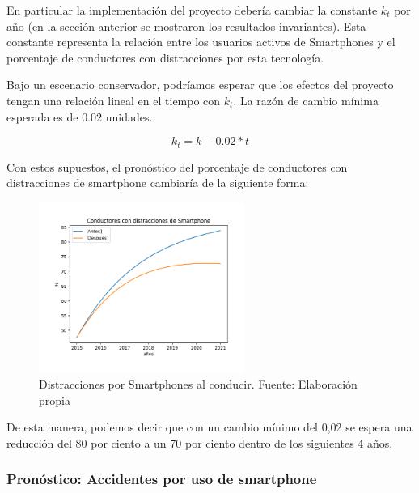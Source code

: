 \documentclass{article}
\begin{document}
En particular la implementación del proyecto debería cambiar la constante $k_t$ por año (en la sección anterior
se mostraron los resultados invariantes). Esta constante representa la relación entre los usuarios activos de Smartphones
y el porcentaje de conductores con distracciones por esta tecnología.

Bajo un escenario conservador, podríamos esperar que los efectos del proyecto tengan una relación lineal en el tiempo
con $k_t$. La razón de cambio mínima esperada es de $0.02$ unidades.

\begin{equation}
k_{t} = k - 0.02 * t
\end{equation}

Con estos supuestos, el pronóstico del porcentaje de conductores con distracciones de smartphone cambiaría de la
siguiente forma:

	\begin{figure}[H]\centering
	\includegraphics[width=0.6\textwidth]{resources/img/distraction_compare_img.png}
	\caption{\label{fig:smart_accidents_compare} Distracciones por Smartphones al conducir. Fuente: Elaboración propia}
    \end{figure}

De esta manera, podemos decir que con un cambio mínimo del 0,02 se espera una reducción del 80 por ciento  a un 70 por ciento dentro de los siguientes 4 años.

\subsubsection{Pronóstico: Accidentes por uso de smartphone}
\end{document}
